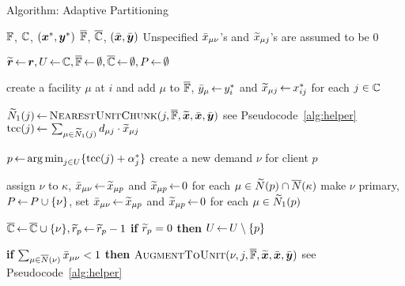 \documentclass{llncs}
\begin{document}
\begin{algorithm}[ht]
  \caption{Algorithm: Adaptive Partitioning}
  \label{alg:lpr2}
  \begin{algorithmic}[1]
    \Require $\mathbb{F}$, $\mathbb{C}$, $(\boldsymbol{x}^\ast,\boldsymbol{y}^\ast)$
    \Ensure  $\overline{\mathbb{F}}$,  $\overline{\mathbb{C}}$, $(\bar{\boldsymbol{x}}, \bar{\boldsymbol{y}})$ 
    \Comment Unspecified ${\bar x}_{\mu \nu}$'s and ${\widetilde x}_{\mu j}$'s are assumed to be $0$

    \State $\widetilde{\boldsymbol{r}} {\,\leftarrow\,} \boldsymbol{r}, U{\,\leftarrow\,} \mathbb{C}, \overline{\mathbb{F}}{\,\leftarrow\,} \emptyset,
    \overline{\mathbb{C}}{\,\leftarrow\,} \emptyset, P{\,\leftarrow\,} \emptyset$

    \State create a facility $\mu$ at $i$ and add $\mu$ to $\overline{\mathbb{F}}$,
    ${\bar y}_\mu {\,\leftarrow\,} y_i^\ast$ and ${\widetilde x}_{\mu j}{\,\leftarrow\,}
    x_{ij}^\ast$ for each $j\in\mathbb{C}$ 
    \EndFor

    \State ${\widetilde N}_1(j) {\,\leftarrow\,} {{\textsc{NearestUnitChunk}}}(j, \overline{\mathbb{F}}, \widetilde{\boldsymbol{x}}, \bar{\boldsymbol{x}}, \bar{\boldsymbol{y}})$ \Comment see Pseudocode~\ref{alg:helper}
    \State $\textrm{tcc}(j){\,\leftarrow\,} \sum_{\mu\in {\widetilde N}_1(j)} d_{{\mu}j}\cdot {\widetilde x}_{\mu j}$
    \EndFor
 
    \State $p {\,\leftarrow\,} {\operatorname*{arg\,min}}_{j\in U}\{ \textrm{tcc}(j)+\alpha_j^\ast \}$
    \State create a new demand $\nu$ for client $p$

    \State assign $\nu$ to $\kappa$,
    ${\bar x}_{\mu \nu}{\,\leftarrow\,} {\widetilde x}_{\mu p}$ and ${\widetilde x}_{\mu p}{\,\leftarrow\,} 0$ for each $\mu \in {\widetilde N}(p) \cap {\overline{N}}(\kappa)$
    \Else 
    \State make $\nu$ primary, $P {\,\leftarrow\,} P \cup \{\nu\}$,
    set ${\bar x}_{\mu\nu} {\,\leftarrow\,} {\widetilde x}_{\mu p}$ and ${\widetilde x}_{\mu p}{\,\leftarrow\,} 0$ for each $\mu\in {\widetilde N}_1(p)$

    \EndIf
    \State $\overline{\mathbb{C}}{\,\leftarrow\,} \overline{\mathbb{C}}\cup \{\nu\},
    {\widetilde r}_p {\,\leftarrow\,} {\widetilde r}_p -1$
	\State \textbf{if} {${\widetilde r}_p=0$} \textbf{then} $U{\,\leftarrow\,} U \setminus \{p\}$
    \EndWhile

     
        
    \State \textbf{if} $\sum_{\mu\in {\overline{N}}(\nu)}{\bar x}_{\mu\nu}<1$
    \textbf{then} ${\textsc{AugmentToUnit}}(\nu, j, \overline{\mathbb{F}}, \widetilde{\boldsymbol{x}}, \bar{\boldsymbol{x}}, \bar{\boldsymbol{y}})$ \Comment see Pseudocode~\ref{alg:helper}
    \EndFor
    \EndFor
  \end{algorithmic}
\end{algorithm}
\end{document}
